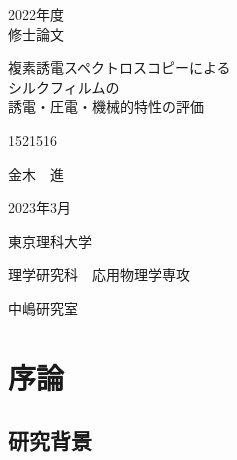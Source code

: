 \documentclass[dvipdfmx,12pt,a4paper]{jreport}
\begin{document}
	\begin{titlepage}
		
		\begin{center}
			
			\vspace{20truept}
			{\LARGE 2022年度}\\
			\vspace{15truept}
			{\LARGE 修士論文}
			
			\vspace{50truept}
			
			{\Huge 複素誘電スペクトロスコピーによる\\シルクフィルムの\\誘電・圧電・機械的特性の評価}\\
			\vspace{10truept}
			
			\vspace*{260truept}
			
			{\LARGE 1521516}\\
			\vspace{5truept}
			
			{\LARGE 金木　進}\\
			\vspace{60truept}
			
			{\LARGE 2023年3月}
			\vspace{30truept}
			
			{\LARGE 東京理科大学}\\
			\vspace{15truept}
			
			{\LARGE 理学研究科　応用物理学専攻}\\
			\vspace{15truept}
			
			{\LARGE 中嶋研究室}\\
			
		\end{center}
		
		
	\end{titlepage}
  \thispagestyle{empty}
	\clearpage
\addtocounter{page}{0}
\tableofcontents
  \chapter{序論}
		\section{研究背景}
\end{document}
